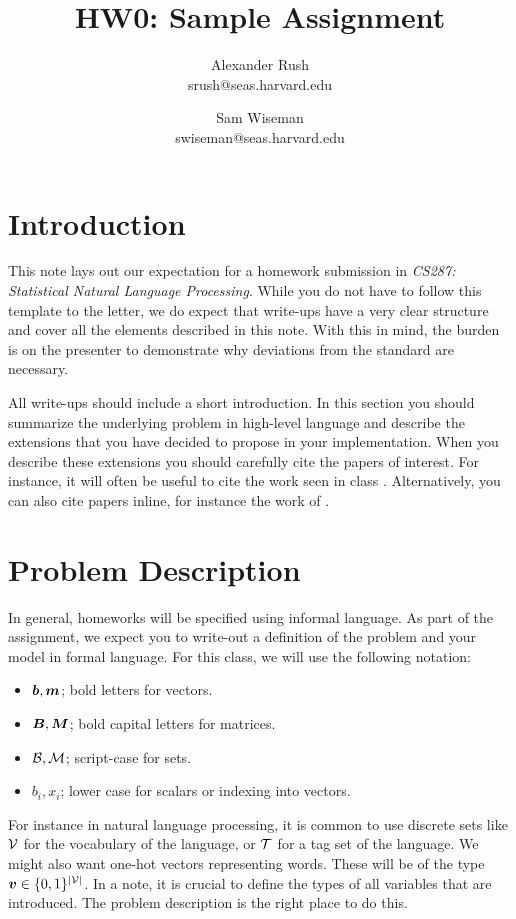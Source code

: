 \documentclass[11pt]{article}
\title{HW0: Sample Assignment}
\author{Alexander Rush \\ srush@seas.harvard.edu \and Sam Wiseman \\ swiseman@seas.harvard.edu }
\begin{document}
\maketitle{}
\section{Introduction}

This note lays out our expectation for a homework submission in
\textit{CS287: Statistical Natural Language Processing}. While you do
not have to follow this template to the letter, we do expect that
write-ups have a very clear structure and cover all the elements
described in this note. With this in mind, the burden is on the
presenter to demonstrate why deviations from the standard are
necessary.

All write-ups should include a short introduction. In this section you
should summarize the underlying problem in high-level language and
describe the extensions that you have decided to propose in your
implementation. When you describe these extensions you should
carefully cite the papers of interest. For instance, it will often be
useful to cite the work seen in class
\citep{murphy2012machine}. Alternatively, you can also cite papers
inline, for instance the work of \citet{berger1996maximum}.


\section{Problem Description}

In general, homeworks will be specified using informal
language. As part of the assignment, we expect you to write-out a
definition of the problem and your model in formal language. For this
class, we will use the following notation:

\begin{itemize}
\item $\boldsymbol{b}, \boldsymbol{m}$;  bold letters for vectors.
\item $\boldsymbol{B}, \boldsymbol{M}$;  bold capital letters for matrices.
\item $\mathcal{B}, \mathcal{M}$;  script-case for sets.
\item $b_i, x_i$; lower case for scalars or indexing into vectors.
\end{itemize}


For instance in natural language processing, it is common to use
discrete sets like $\mathcal{V}$ for the vocabulary of the language, or $\mathcal{T}$ for a
tag set of the language.  We might also want one-hot vectors
representing words. These will be of the type
$\boldsymbol{v} \in \{0,1\}^{|\mathcal{V}|}$. In a note, it is crucial to define the
types of all variables that are introduced. The problem description is the
right place to do this.
\end{document}
